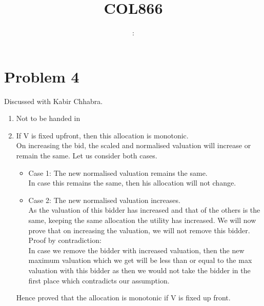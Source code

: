 \documentclass{article}
\title{COL866 \exerciseset}
\author{\studentname \qquad \newline: \suid}
\begin{document}
\maketitle

\section*{Problem 4}
Discussed with Kabir Chhabra.
\begin{enumerate}
\item %
		Not to be handed in
\item %
If V is fixed upfront, then this allocation is monotonic. \\
On increasing the bid, the scaled and normalised valuation will increase or remain the same. Let us consider both cases. \\
\begin{itemize}
	\item Case 1: The new normalised valuation remains the same. \\
			In case this remains the same, then his allocation will not change.
	\item Case 2: The new normalised valuation increases. \\
			As the valuation of this bidder has increased and that of the others is the same, keeping the same allocation the utility has increased.
			We will now prove that on increasing the valuation, we will not remove this bidder. \\
			Proof by contradiction: \\
				In case we remove the bidder with increased valuation, then the new maximum valuation which we get will be less than or equal to the max valuation with this bidder as 
				then we would not take the bidder in the first place which contradicts our assumption.
\end{itemize}
Hence proved that the allocation is monotonic if V is fixed up front.


\end{enumerate}
\end{document}
